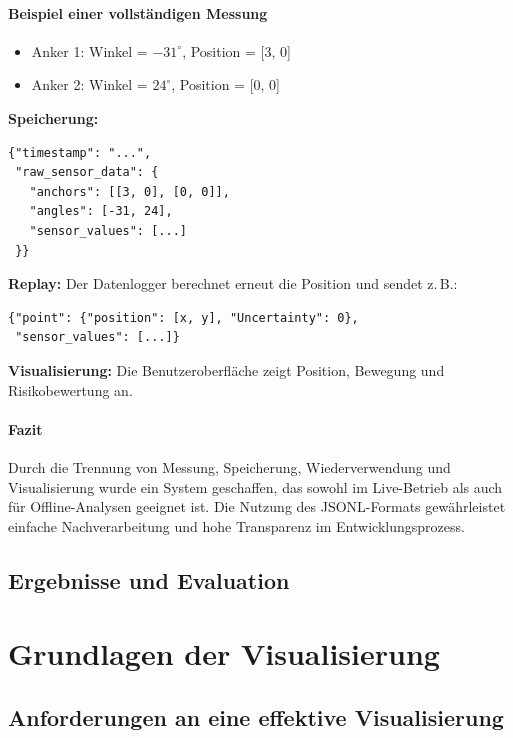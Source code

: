 \documentclass[a4paper, 12pt]{article} %
\begin{document}
\paragraph{Beispiel einer vollständigen Messung}

\begin{itemize}
    \item Anker 1: Winkel = \(-31^\circ\), Position = [3, 0]
    \item Anker 2: Winkel = \(24^\circ\), Position = [0, 0]
\end{itemize}

\textbf{Speicherung:}
\begin{verbatim}
{"timestamp": "...", 
 "raw_sensor_data": {
   "anchors": [[3, 0], [0, 0]], 
   "angles": [-31, 24], 
   "sensor_values": [...]
 }}
\end{verbatim}

\textbf{Replay:}  
Der Datenlogger berechnet erneut die Position und sendet z.\,B.:

\begin{verbatim}
{"point": {"position": [x, y], "Uncertainty": 0}, 
 "sensor_values": [...]}
\end{verbatim}

\textbf{Visualisierung:}  
Die Benutzeroberfläche zeigt Position, Bewegung und Risikobewertung an.

\paragraph{Fazit}

Durch die Trennung von Messung, Speicherung, Wiederverwendung und Visualisierung wurde ein System geschaffen, 
das sowohl im Live-Betrieb als auch für Offline-Analysen geeignet ist. Die Nutzung des JSONL-Formats gewährleistet einfache 
Nachverarbeitung und hohe Transparenz im Entwicklungsprozess.



\subsection{Ergebnisse und Evaluation}

\section{Grundlagen der Visualisierung}
\subsection{Anforderungen an eine effektive Visualisierung}
\end{document}
